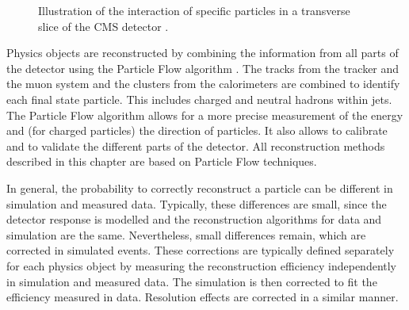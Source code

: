 \begin{figure}[htbp!]
  \begin{center}
\caption{Illustration of the interaction of specific particles in a transverse slice of the CMS detector \cite{Sirunyan:2017ulk}.
  \label{fig:reco_pflow}}
  \end{center}
\end{figure}

Physics objects are reconstructed by combining the information from all parts of the detector using the Particle Flow algorithm \cite{Sirunyan:2017ulk}.
The tracks from the tracker and the muon system and the clusters from the calorimeters are combined to identify each final state particle.
This includes charged and neutral hadrons within jets. The Particle Flow algorithm allows for a more precise measurement of the energy and (for charged particles) the direction of particles.
It also allows to calibrate and to validate the different parts of the detector. All reconstruction methods described in this chapter are based on Particle Flow techniques.

In general, the probability to correctly reconstruct a particle can be different in simulation and measured data. Typically, these differences are small, since the detector response
is modelled and the reconstruction algorithms for data and simulation are the same. Nevertheless, small differences remain, which are corrected in simulated events.
These corrections are typically defined separately for each physics object by measuring the reconstruction efficiency independently in simulation and measured data.
The simulation is then corrected to fit the efficiency measured in data. Resolution effects are corrected in a similar manner.

